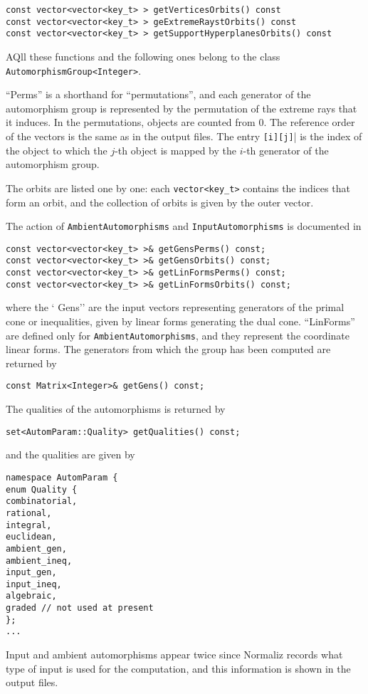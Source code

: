 \begin{small}
\begin{Verbatim}
const vector<vector<key_t> > getVerticesOrbits() const
const vector<vector<key_t> > geExtremeRaystOrbits() const
const vector<vector<key_t> > getSupportHyperplanesOrbits() const
\end{Verbatim}
AQll these functions and the following ones belong to the class \verb|AutomorphismGroup<Integer>|.

``Perms'' is a shorthand for ``permutations'', and each generator of the automorphism group is represented by the permutation of the extreme rays that it induces. In the permutations, objects are counted from $0$. The reference order of the vectors is the same as in the output files. The entry \verb|[i][j]|| is the index of the object to which the $j$-th object is mapped by the $i$-th generator of the automorphism group.

The orbits are listed one by one: each \verb|vector<key_t>| contains the indices that form an orbit, and the collection of orbits is given by the outer vector.

The action  of \verb|AmbientAutomorphisms| and \verb|InputAutomorphisms| is documented in
\begin{Verbatim}
const vector<vector<key_t> >& getGensPerms() const;
const vector<vector<key_t> >& getGensOrbits() const;
const vector<vector<key_t> >& getLinFormsPerms() const;
const vector<vector<key_t> >& getLinFormsOrbits() const; 
\end{Verbatim}
where the ` Gens'' are the input vectors representing generators of the primal cone or inequalities, given by linear forms  generating the dual cone. ``LinForms'' are defined only for \verb|AmbientAutomorphisms|, and they represent the coordinate linear forms. The generators from which the group has been computed are returned by
\begin{Verbatim}
const Matrix<Integer>& getGens() const;
\end{Verbatim}

The qualities of the automorphisms is returned by
\begin{Verbatim}
set<AutomParam::Quality> getQualities() const;
\end{Verbatim}
and the qualities are given by
\begin{Verbatim} 
namespace AutomParam {
enum Quality {
combinatorial,
rational,
integral,
euclidean,
ambient_gen,
ambient_ineq,
input_gen,
input_ineq,
algebraic,
graded // not used at present
};
...
\end{Verbatim}
Input and ambient automorphisms appear twice since Normaliz records what type of input is used for the computation, and this information is shown in the output files.


\end{small}
